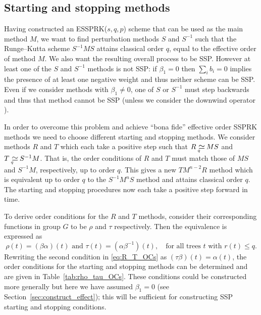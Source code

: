 \subsection{Starting and stopping methods}\label{subsec:starting_stopping}
Having constructed an ESSPRK($s,q,p$) scheme that can be used as the main 
method $M$, we want to find perturbation methods $S$ and $S^{-1}$ such that the 
Runge--Kutta scheme $S^{-1}MS$ attains classical order $q$, equal to the 
effective order of method $M$.
We also want the resulting overall process to be SSP.
However at least one of the $S$ and $S^{-1}$ methods is not SSP:
if $\beta_1 = 0$ then $\sum_i b_i = 0$ implies the presence of at
least one negative weight and thus neither scheme can be SSP.
Even if we consider methods with $\beta_1 \neq 0$, one of $S$ or
$S^{-1}$ must step backwards and thus that method cannot be SSP
(unless we consider the downwind operator
\cite{Ruuth2004,Gottlieb/Ruuth:SSPfastdownwind,Ketcheson:2011:downwind}).

In order to overcome this problem and achieve ``bona fide'' effective order 
SSPRK methods we need to choose different starting and stopping methods. 
We consider methods $R$ and $T$ which each take a positive step such that 
$R \equival{q} MS$ and $T \equival{q} S^{-1}M$.
That is, the order conditions of $R$ and $T$ must match those of
$MS$ and $S^{-1}M$, respectively, up to order $q$.
This gives a new $TM^{n-2}R$ method which is equivalent up to order $q$ 
to the $S^{-1}M^nS$ method and attains classical order $q$.
The starting and stopping procedures now each take a positive step forward 
in time.

To derive order conditions for the $R$ and $T$ methods, consider their
corresponding functions in group $G$ to be $\rho$ and $\tau$
respectively.
Then the equivalence is expressed as
\begin{equation} \label{eq:R_T_OCs}
    \rho(t) = (\beta\alpha)(t) \text{ and } \tau(t) = (\alpha\beta^{-1})(t), \quad \text{for all 
    trees $t$ with $r(t) \leq q$.}
\end{equation}
Rewriting the second condition in \eqref{eq:R_T_OCs} as 
$(\tau\beta)(t) = \alpha(t)$, the order conditions for the starting and stopping 
methods can be determined and are given in Table~\ref{tab:rho_tau_OCs}.
These conditions could be constructed more generally but here we have
assumed $\beta_1=0$ (see Section~\ref{sec:construct_effect}); this
will be sufficient for constructing SSP starting and stopping
conditions.


